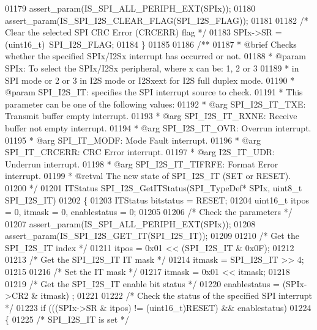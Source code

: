 \begin{DoxyCode}
01179   assert_param(IS\_SPI\_ALL\_PERIPH\_EXT(SPIx));
01180   assert_param(IS\_SPI\_I2S\_CLEAR\_FLAG(SPI\_I2S\_FLAG));
01181 
01182   \textcolor{comment}{/* Clear the selected SPI CRC Error (CRCERR) flag */}
01183   SPIx->SR = (uint16\_t)~SPI\_I2S\_FLAG;
01184 \}
01185 
01186 \textcolor{comment}{/**}
01187 \textcolor{comment}{  * @brief  Checks whether the specified SPIx/I2Sx interrupt has occurred or not.}
01188 \textcolor{comment}{  * @param  SPIx: To select the SPIx/I2Sx peripheral, where x can be: 1, 2 or 3 }
01189 \textcolor{comment}{  *         in SPI mode or 2 or 3 in I2S mode or I2Sxext for I2S full duplex mode.  }
01190 \textcolor{comment}{  * @param  SPI\_I2S\_IT: specifies the SPI interrupt source to check. }
01191 \textcolor{comment}{  *          This parameter can be one of the following values:}
01192 \textcolor{comment}{  *            @arg SPI\_I2S\_IT\_TXE: Transmit buffer empty interrupt.}
01193 \textcolor{comment}{  *            @arg SPI\_I2S\_IT\_RXNE: Receive buffer not empty interrupt.}
01194 \textcolor{comment}{  *            @arg SPI\_I2S\_IT\_OVR: Overrun interrupt.}
01195 \textcolor{comment}{  *            @arg SPI\_IT\_MODF: Mode Fault interrupt.}
01196 \textcolor{comment}{  *            @arg SPI\_IT\_CRCERR: CRC Error interrupt.}
01197 \textcolor{comment}{  *            @arg I2S\_IT\_UDR: Underrun interrupt.  }
01198 \textcolor{comment}{  *            @arg SPI\_I2S\_IT\_TIFRFE: Format Error interrupt.  }
01199 \textcolor{comment}{  * @retval The new state of SPI\_I2S\_IT (SET or RESET).}
01200 \textcolor{comment}{  */}
01201 ITStatus SPI_I2S_GetITStatus(SPI\_TypeDef* SPIx, uint8\_t SPI\_I2S\_IT)
01202 \{
01203   ITStatus bitstatus = RESET;
01204   uint16\_t itpos = 0, itmask = 0, enablestatus = 0;
01205 
01206   \textcolor{comment}{/* Check the parameters */}
01207   assert_param(IS\_SPI\_ALL\_PERIPH\_EXT(SPIx));
01208   assert_param(IS\_SPI\_I2S\_GET\_IT(SPI\_I2S\_IT));
01209 
01210   \textcolor{comment}{/* Get the SPI\_I2S\_IT index */}
01211   itpos = 0x01 << (SPI\_I2S\_IT & 0x0F);
01212 
01213   \textcolor{comment}{/* Get the SPI\_I2S\_IT IT mask */}
01214   itmask = SPI\_I2S\_IT >> 4;
01215 
01216   \textcolor{comment}{/* Set the IT mask */}
01217   itmask = 0x01 << itmask;
01218 
01219   \textcolor{comment}{/* Get the SPI\_I2S\_IT enable bit status */}
01220   enablestatus = (SPIx->CR2 & itmask) ;
01221 
01222   \textcolor{comment}{/* Check the status of the specified SPI interrupt */}
01223   \textcolor{keywordflow}{if} (((SPIx->SR & itpos) != (uint16\_t)RESET) && enablestatus)
01224   \{
01225     \textcolor{comment}{/* SPI\_I2S\_IT is set */}

\end{DoxyCode}
